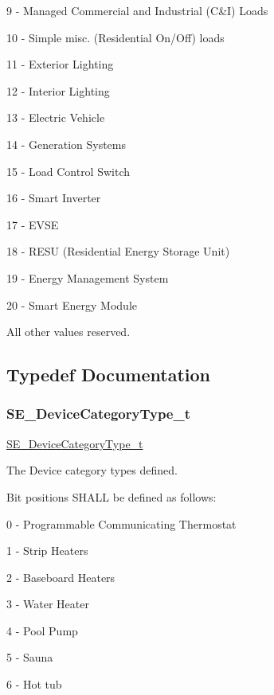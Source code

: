 9 -\/ Managed Commercial and Industrial (C\&I) Loads

10 -\/ Simple misc. (Residential On/\+Off) loads

11 -\/ Exterior Lighting

12 -\/ Interior Lighting

13 -\/ Electric Vehicle

14 -\/ Generation Systems

15 -\/ Load Control Switch

16 -\/ Smart Inverter

17 -\/ E\+V\+SE

18 -\/ R\+E\+SU (Residential Energy Storage Unit)

19 -\/ Energy Management System

20 -\/ Smart Energy Module

All other values reserved. 

\subsection{Typedef Documentation}
\mbox{\label{group__DeviceCategoryType_gafc136ae19a3dd5b2fd2265d848ddeb2f}} 
\subsubsection{\texorpdfstring{S\+E\+\_\+\+Device\+Category\+Type\+\_\+t}{SE\_DeviceCategoryType\_t}}
{\footnotesize\ttfamily \hyperlink{group__DeviceCategoryType_gafc136ae19a3dd5b2fd2265d848ddeb2f}{S\+E\+\_\+\+Device\+Category\+Type\+\_\+t}}

The Device category types defined.

Bit positions S\+H\+A\+LL be defined as follows\+:

0 -\/ Programmable Communicating Thermostat

1 -\/ Strip Heaters

2 -\/ Baseboard Heaters

3 -\/ Water Heater

4 -\/ Pool Pump

5 -\/ Sauna

6 -\/ Hot tub

